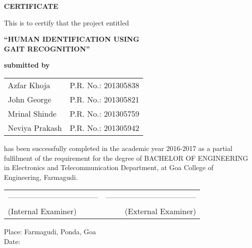 \begin{center}
\begin{Huge}
{\bfseries CERTIFICATE}\\
\end{Huge}
\vspace{1cm}
{\normalsize This is to certify that the project entitled}\\
\vspace{0.3cm}
\begin{large}
{\bfseries ``HUMAN IDENTIFICATION USING \\GAIT RECOGNITION''}\\
\end{large}
\vspace{0.3cm}
{\bfseries submitted by}\\
\vspace{0.8cm}
\begin{table}[H]
\normalsize
\bfseries
\begin{center}
\begin{tabular}{ll}
Azfar Khoja \hspace{1cm} & P.R. No.: 201305838\\
John George & P.R. No.: 201305821\\
Mrinal Shinde & P.R. No.: 201305759\\
Neviya Prakash & P.R. No.: 201305942\\
\end{tabular}
\end{center}
\end{table}
\end{center}
\noindent has been successfully completed in the academic year 2016-2017 as a partial fulfilment of the requirement for the degree of BACHELOR OF ENGINEERING in Electronics and Telecommunication Department, at Goa College of Engineering, Farmagudi.\\
\vspace{1.3cm}
\begin{table}[H]
\begin{tabular}{lr}
\noindent ----------------------------------- & \hspace{6cm} ----------------------------------- \\
(Internal Examiner) & (External Examiner)\\
\end{tabular}
\end{table}
\vspace{1.3cm}
\noindent Place: Farmagudi, Ponda, Goa\\
\noindent Date: 